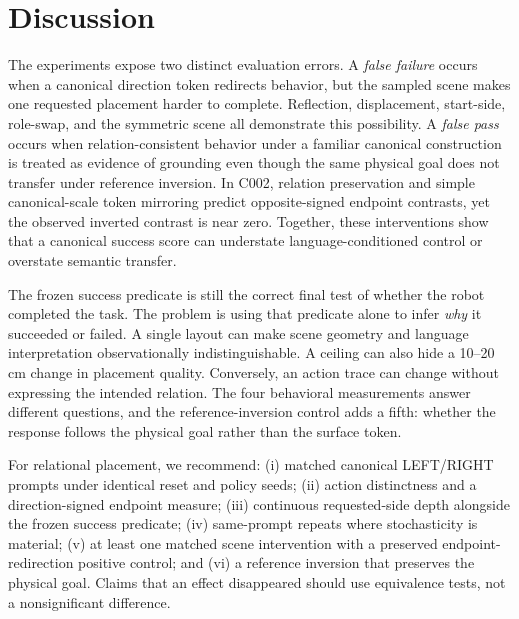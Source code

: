 \section{Discussion}
\label{sec:discussion}

The experiments expose two distinct evaluation errors. A \emph{false failure} occurs when a canonical direction token redirects behavior, but the sampled scene makes one requested placement harder to complete. Reflection, displacement, start-side, role-swap, and the symmetric scene all demonstrate this possibility. A \emph{false pass} occurs when relation-consistent behavior under a familiar canonical construction is treated as evidence of grounding even though the same physical goal does not transfer under reference inversion. In C002, relation preservation and simple canonical-scale token mirroring predict opposite-signed endpoint contrasts, yet the observed inverted contrast is near zero. Together, these interventions show that a canonical success score can understate language-conditioned control or overstate semantic transfer.

The frozen success predicate is still the correct final test of whether the robot completed the task. The problem is using that predicate alone to infer \emph{why} it succeeded or failed. A single layout can make scene geometry and language interpretation observationally indistinguishable. A ceiling can also hide a 10--20\,cm change in placement quality. Conversely, an action trace can change without expressing the intended relation. The four behavioral measurements answer different questions, and the reference-inversion control adds a fifth: whether the response follows the physical goal rather than the surface token.

For relational placement, we recommend: (i) matched canonical LEFT/RIGHT prompts under identical reset and policy seeds; (ii) action distinctness and a direction-signed endpoint measure; (iii) continuous requested-side depth alongside the frozen success predicate; (iv) same-prompt repeats where stochasticity is material; (v) at least one matched scene intervention with a preserved endpoint-redirection positive control; and (vi) a reference inversion that preserves the physical goal. Claims that an effect disappeared should use equivalence tests, not a nonsignificant difference.

